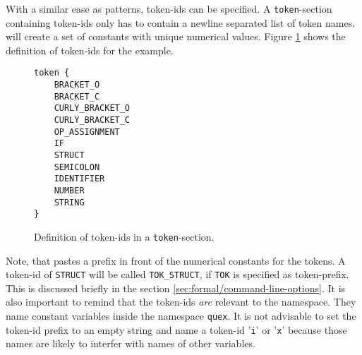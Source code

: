 With a similar ease as patterns, token-ids can be specified. A {\tt token}-section  containing
token-ids only has to contain a newline separated list of token names.
{\Quex} will create a set of constants with unique numerical values. Figure
\ref{fig:token-ids-code} shows the definition of token-ids for the example.

\begin{figure}
\begin{lstlisting}
token {
    BRACKET_O
    BRACKET_C
    CURLY_BRACKET_O
    CURLY_BRACKET_C
    OP_ASSIGNMENT
    IF
    STRUCT
    SEMICOLON
    IDENTIFIER
    NUMBER
    STRING
}
\end{lstlisting}
\label{fig:token-ids-code}
\caption{Definition of token-ids in a {\tt token}-section.}
\end{figure}

Note, that pastes a prefix in front of the numerical constants for the tokens.
A token-id of {\tt STRUCT} will be called {\tt TOK\_STRUCT}, if {\tt TOK} is
specified as token-prefix. This is discussed briefly in the section
\ref{sec:formal/command-line-options}. It is also important to remind that
the token-ids {\it are} relevant to the namespace. They name constant variables
inside the namespace {\tt quex}. It is not advisable to set the token-id prefix
to an empty string and name a token-id '{\tt i}' or '{\tt x}' because those 
names are likely to interfer with names of other variables.

